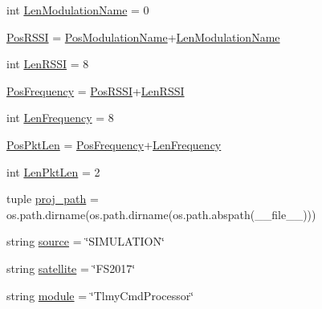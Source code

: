 \begin{DoxyCompactItemize}
\item 
int \hyperlink{namespace_tlmy_cmd_processor_1_1_tlmy_cmd_processor_ada4bf8a260b4fea1839785e2928f71b2}{Len\+Modulation\+Name} = 0
\item 
\hyperlink{namespace_tlmy_cmd_processor_1_1_tlmy_cmd_processor_ab27c15b24c6222fb45f6825e563bfeae}{Pos\+R\+S\+S\+I} = \hyperlink{namespace_tlmy_cmd_processor_1_1_tlmy_cmd_processor_ac1137c905bca1594a8a5691668001c00}{Pos\+Modulation\+Name}+\hyperlink{namespace_tlmy_cmd_processor_1_1_tlmy_cmd_processor_ada4bf8a260b4fea1839785e2928f71b2}{Len\+Modulation\+Name}
\item 
int \hyperlink{namespace_tlmy_cmd_processor_1_1_tlmy_cmd_processor_a879b2c02ed1a38b0c9a0da5f30bdebd2}{Len\+R\+S\+S\+I} = 8
\item 
\hyperlink{namespace_tlmy_cmd_processor_1_1_tlmy_cmd_processor_aff115557ac981e9e7b5d05fc450de80b}{Pos\+Frequency} = \hyperlink{namespace_tlmy_cmd_processor_1_1_tlmy_cmd_processor_ab27c15b24c6222fb45f6825e563bfeae}{Pos\+R\+S\+S\+I}+\hyperlink{namespace_tlmy_cmd_processor_1_1_tlmy_cmd_processor_a879b2c02ed1a38b0c9a0da5f30bdebd2}{Len\+R\+S\+S\+I}
\item 
int \hyperlink{namespace_tlmy_cmd_processor_1_1_tlmy_cmd_processor_abac774909f35b54d636c7b68839964a4}{Len\+Frequency} = 8
\item 
\hyperlink{namespace_tlmy_cmd_processor_1_1_tlmy_cmd_processor_acba5b0985ab65f322a69d59144555d63}{Pos\+Pkt\+Len} = \hyperlink{namespace_tlmy_cmd_processor_1_1_tlmy_cmd_processor_aff115557ac981e9e7b5d05fc450de80b}{Pos\+Frequency}+\hyperlink{namespace_tlmy_cmd_processor_1_1_tlmy_cmd_processor_abac774909f35b54d636c7b68839964a4}{Len\+Frequency}
\item 
int \hyperlink{namespace_tlmy_cmd_processor_1_1_tlmy_cmd_processor_aaa7975541edbc48dcb803ca7acca8e20}{Len\+Pkt\+Len} = 2
\item 
tuple \hyperlink{namespace_tlmy_cmd_processor_1_1_tlmy_cmd_processor_af01cc83846e14e401a5a2fbaec2fe940}{proj\+\_\+path} = os.\+path.\+dirname(os.\+path.\+dirname(os.\+path.\+abspath(\+\_\+\+\_\+file\+\_\+\+\_\+)))
\item 
string \hyperlink{namespace_tlmy_cmd_processor_1_1_tlmy_cmd_processor_acef2a3d30bda6af9c56309eea6b12246}{source} = \char`\"{}S\+I\+M\+U\+L\+A\+T\+I\+O\+N\char`\"{}
\item 
string \hyperlink{namespace_tlmy_cmd_processor_1_1_tlmy_cmd_processor_a5cf95a9cff868554c46d7a901df74673}{satellite} = \char`\"{}F\+S2017\char`\"{}
\item 
string \hyperlink{namespace_tlmy_cmd_processor_1_1_tlmy_cmd_processor_a8f2365862c9bbb4fe399b2d3f801b4d5}{module} = \char`\"{}Tlmy\+Cmd\+Processor\char`\"{}

\end{DoxyCompactItemize}

